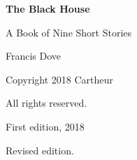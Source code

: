 \documentclass[11pt,oneside]{book}
\begin{document}
\frontmatter
\thispagestyle{empty}
\vspace*{\fill}
\begin{center}
{\Huge \textbf{The Black House}\par}
\vspace{1em}
{\Large A Book of Nine Short Stories\par}
\vspace{2em}
{\Large Francis Dove\par}
\end{center}
\vspace*{\fill}
\clearpage

\thispagestyle{empty}
\vspace*{\fill}
\begin{center}
Copyright \textcopyright{} 2018 Cartheur

All rights reserved.

\vspace{1em}
First edition, 2018

\vspace{1em}
Revised edition.
\end{center}
\vspace*{\fill}
\clearpage

\tableofcontents
\clearpage

\mainmatter

\end{document}
